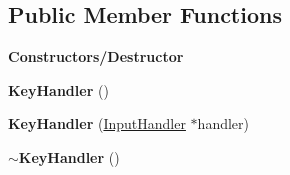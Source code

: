 \subsection*{Public Member Functions}
\begin{Indent}\textbf{ Constructors/\+Destructor}\par
\begin{DoxyCompactItemize}
\item 
\mbox{\label{classrev_1_1_key_handler_a79f7fd7a582241dd248ece96980371e4}} 
{\bfseries Key\+Handler} ()
\item 
\mbox{\label{classrev_1_1_key_handler_afbd953157932e565b0082277c8e9e21d}} 
{\bfseries Key\+Handler} (\mbox{\hyperlink{classrev_1_1_input_handler}{Input\+Handler}} $\ast$handler)
\item 
\mbox{\label{classrev_1_1_key_handler_a0de59f6009787a4356c7beb712ab4076}} 
{\bfseries $\sim$\+Key\+Handler} ()
\end{DoxyCompactItemize}
\end{Indent}
